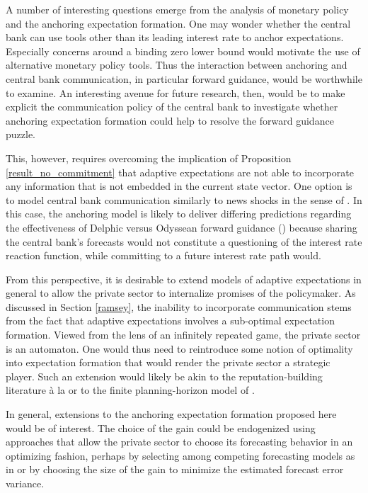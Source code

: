 \documentclass[11pt]{article}
\renewcommand{\[}{\begin{equation}}
\renewcommand{\]}{\end{equation}}
\begin{document}
A number of interesting questions emerge from the analysis of monetary policy and the anchoring expectation formation. One may wonder whether the central bank can use tools other than its leading interest rate to anchor expectations. Especially concerns around a binding zero lower bound would motivate the use of alternative monetary policy tools. Thus the interaction between anchoring and central bank communication, in particular forward guidance, would be worthwhile to examine. An interesting avenue for future research, then, would be to make explicit the communication policy of the central bank to investigate whether anchoring expectation formation could help to resolve the forward guidance puzzle. 

This, however, requires overcoming the implication of Proposition \ref{result_no_commitment} that adaptive expectations are not able to incorporate any information that is not embedded in the current state vector. One option is to model central bank communication similarly to news shocks in the sense of \cite{beaudry2006stock}. In this case, the anchoring model is likely to deliver differing predictions regarding the effectiveness of Delphic versus Odyssean forward guidance (\cite{campbell2012macroeconomic}) because sharing the central bank's forecasts would not constitute a questioning of the interest rate reaction function, while committing to a future interest rate path would.

From this perspective, it is desirable to extend models of adaptive expectations in general to allow the private sector to internalize promises of the policymaker. As discussed in Section \ref{ramsey}, the inability to incorporate communication stems from the fact that adaptive expectations involves a sub-optimal expectation formation. Viewed from the lens of an infinitely repeated game, the private sector is an automaton. One would thus need to reintroduce some notion of optimality into expectation formation that would render the private sector a strategic player. Such an extension would likely be akin to the reputation-building literature \`a la \cite{cho1995induction} or to the finite planning-horizon model of \cite{woodford2019monetary}. 

In general, extensions to the anchoring expectation formation proposed here would be of interest. The choice of the gain could be endogenized using approaches that allow the private sector to choose its forecasting behavior in an optimizing fashion, perhaps by selecting among competing forecasting models as in \cite{Branch2011} or by choosing the size of the gain to minimize the estimated forecast error variance. 
\end{document}
